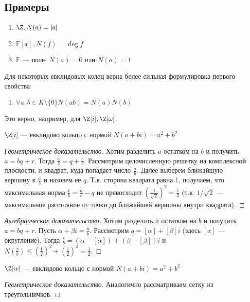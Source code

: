 \subsection{Примеры}
\begin{enumerate}
    \item \(\Z, N(a) = |a|\)
    \item \(\mathbb{F}[x], N(f) = \deg f\)
    \item \(\mathbb{F}\) --- поле, \(N(a) = 0\) или \(N(a) = 1\)
\end{enumerate}

Для некоторых евклидовых колец верна более сильная формулировка первого свойства:
\begin{enumerate}
    \item[\(1^*\).] \(\forall a, b \in K \setminus \{0\} N(ab) = N(a)N(b)\)
\end{enumerate}

Это верно, например, для \(\Z[i], \Z[\omega]\).

\begin{proposition}
    \(\Z[i]\) --- евклидово кольцо с нормой \(N(a + bi) = a^2 + b^2\)
\end{proposition}
\begin{proof}[Геометрическое доказательство]
    Хотим разделить \(a\) остатком на \(b\) и получить \(a = bq + r\). Тогда \(\frac{a}{b} = q + \frac{r}{b}\). Рассмотрим целочисленную решетку на комплексной плоскости, и квадрат, куда попадает число \(\frac{a}{b}\). Далее выберем ближайшую вершину к \(\frac{a}{b}\) и назовем ее \(q\). Т.к. сторона квалрата равна 1, получаем, что максимальная норма \(\frac{r}{b} = \frac{a}{b} - q\) не превосходит \(\left( \frac{1}{\sqrt{2}} \right)^2 = \frac{1}{2}\) (т.к. \(1/\sqrt{2}\) --- максимальное расстояние от точки до ближайшей вершины внутри квадрата).
\end{proof}
\begin{proof}[Алгебраическое доказательство]
    Хотим разделить \(a\) остатком на \(b\) и получить \(a = bq + r\). Пусть \(\alpha + \beta i = \frac{a}{b}\). Рассмотрим \(q = [\alpha] + [\beta]i\) (здесь \([x]\) --- округление). Тогда \(\frac{r}{b} = (\alpha - [\alpha]) + (\beta - [\beta])i\) и \(N\left( \frac{r}{b} \right) \le \left( \frac{1}{2} \right)^2 + \left( \frac{1}{2} \right)^2 = \frac{1}{2}\).
\end{proof}


\begin{proposition}
    \(\Z[w]\) --- евклидово кольцо с нормой \(N(a + bi) = a^2 + b^2\)
\end{proposition}
\begin{proof}[Геометрическое доказательство]
    Аналогично рассматриваем сетку из треугольничков.
\end{proof}

